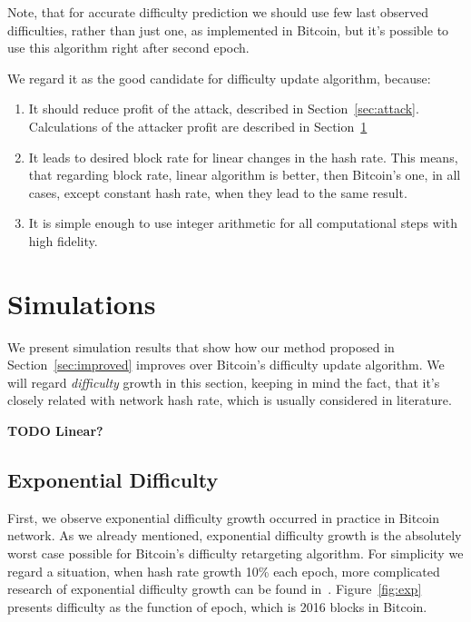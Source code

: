 \documentclass[]{llncs}
\begin{document}
Note, that for accurate difficulty prediction we should use few last observed difficulties, rather than just one, as implemented in Bitcoin, but it's possible to use this algorithm right after second epoch.


We regard it as the good candidate for difficulty update algorithm, because:
\begin{enumerate}
\item{It should reduce profit of the attack, described in Section~\ref{sec:attack}. Calculations of the attacker profit are described in Section~\ref{sec:sim}}
\item{It leads to desired block rate for linear changes in the hash rate.
This means, that regarding block rate, linear algorithm is better, then Bitcoin's one, in all cases, except constant hash rate, when they lead to the same result. }
\item{It is simple enough to use integer arithmetic for all computational steps with high fidelity.}
\end{enumerate}

\section{Simulations}
\label{sec:sim}

We present simulation results that show how our method proposed in Section~\ref{sec:improved} improves over Bitcoin’s difficulty update algorithm.
We will regard \textit{difficulty} growth in this section, keeping in mind the fact, that it's closely related with network hash rate, which is usually considered in literature.


\textbf{TODO Linear?}

\subsection{Exponential Difficulty}

First, we observe exponential difficulty growth occurred in practice in Bitcoin network. As we already mentioned, exponential difficulty growth is the absolutely worst case possible for Bitcoin’s difficulty retargeting algorithm.
For simplicity we regard a situation, when hash rate growth 10\% each epoch, more complicated research of exponential difficulty growth can be found in~\cite{kraft2015difficulty}.
Figure~\ref{fig:exp} presents difficulty as the function of epoch, which is 2016 blocks in Bitcoin.
\end{document}
